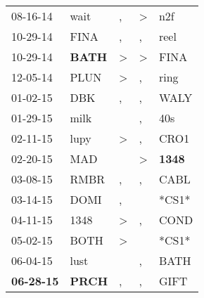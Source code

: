 \begin{supertabular}{p{0.07\textwidth}p{0.06\textwidth}p{0.02\textwidth}p{0.02\textwidth}p{0.06\textwidth}}
          08-16-14\textsuperscript{} &           wait\textsuperscript{} &                , &     \textgreater &            n2f\textsuperscript{} \\
          10-29-14\textsuperscript{} &           FINA\textsuperscript{} &                , &                , &           reel\textsuperscript{} \\
          10-29-14\textsuperscript{} &  \textbf{BATH\textsuperscript{}} &     \textgreater &     \textgreater &           FINA\textsuperscript{} \\
          12-05-14\textsuperscript{} &           PLUN\textsuperscript{} &     \textgreater &                , &           ring\textsuperscript{} \\
          01-02-15\textsuperscript{} &            DBK\textsuperscript{} &                , &                , &           WALY\textsuperscript{} \\
          01-29-15\textsuperscript{} &           milk\textsuperscript{} &                  &                , &            40s\textsuperscript{} \\
          02-11-15\textsuperscript{} &           lupy\textsuperscript{} &     \textgreater &                , &           CRO1\textsuperscript{} \\
          02-20-15\textsuperscript{} &            MAD\textsuperscript{} &                  &     \textgreater &  \textbf{1348\textsuperscript{}} \\
          03-08-15\textsuperscript{} &           RMBR\textsuperscript{} &                , &                , &           CABL\textsuperscript{} \\
          03-14-15\textsuperscript{} &           DOMI\textsuperscript{} &                , &                  &                            *CS1* \\
          04-11-15\textsuperscript{} &           1348\textsuperscript{} &     \textgreater &                , &           COND\textsuperscript{} \\
          05-02-15\textsuperscript{} &           BOTH\textsuperscript{} &     \textgreater &                  &                            *CS1* \\
          06-04-15\textsuperscript{} &           lust\textsuperscript{} &                  &                , &           BATH\textsuperscript{} \\
 \textbf{06-28-15\textsuperscript{}} &  \textbf{PRCH\textsuperscript{}} &                , &                , &           GIFT\textsuperscript{} \\

\end{supertabular}
